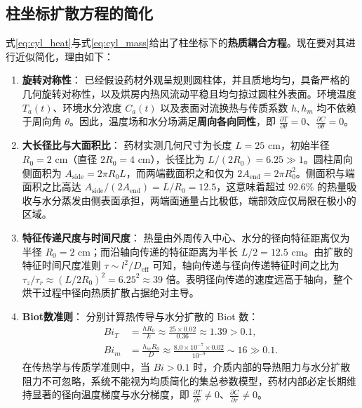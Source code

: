\documentclass[12pt,a4paper,fontset=none]{ctexart}
\begin{document}
\subsection{柱坐标扩散方程的简化}
式\eqref{eq:cyl_heat}与式\eqref{eq:cyl_mass}给出了柱坐标下的\textbf{热质耦合方程}。现在要对其进行近似简化，理由如下：
\begin{enumerate}[label=(\arabic*)]
  \item \textbf{旋转对称性}：
  已经假设药材外观呈规则圆柱体，并且质地均匀，具备严格的几何旋转对称性，以及烘房内热风流动平稳且均匀掠过圆柱外表面。环境温度 $T_a(t)$、环境水分浓度 $C_a(t)$ 以及表面对流换热与传质系数 $h, h_m$ 均不依赖于周向角 $\theta$。因此，温度场和水分场满足\textbf{周向各向同性}，即 $\frac{\partial T}{\partial\theta}=0$、$\frac{\partial C}{\partial\theta}=0$。

  \item \textbf{大长径比与大面积比}：
  药材实测几何尺寸为长度 $L=25\text{ cm}$，初始半径 $R_0=2\text{ cm}$（直径 $2R_0=4\text{ cm}$），长径比为 $L/(2R_0)=6.25\gg1$。圆柱周向侧面积为 $A_{\text{side}}=2\pi R_0 L$，而两端截面积之和仅为 $2A_{\text{end}}=2\pi R_0^2$。侧面积与端面积之比高达 $A_{\text{side}}/(2A_{\text{end}})=L/R_0=12.5$，这意味着超过 $92.6\%$ 的热量吸收与水分蒸发由侧表面承担，两端面通量占比极低，端部效应仅局限在极小的区域。

  \item \textbf{特征传递尺度与时间尺度}：
  热量由外周传入中心、水分的径向特征距离仅为半径 $R_0=2\text{ cm}$；而沿轴向传递的特征距离为半长 $L/2=12.5\text{ cm}$。由扩散的特征时间尺度准则 $\tau \sim l^2/D_{\text{eff}}$ 可知，轴向传递与径向传递特征时间之比为 $\tau_z/\tau_r \approx (L/2R_0)^2 = 6.25^2 \approx 39$ 倍。表明径向传递的速度远高于轴向，整个烘干过程中径向热质扩散占据绝对主导。

  \item \textbf{Biot数准则}：
  分别计算热传导与水分扩散的 Biot 数：
  \begin{align}
  Bi_T &= \frac{h R_0}{k} \approx \frac{25 \times 0.02}{0.36} \approx 1.39 > 0.1,\label{eq:biot_t}\\
  Bi_m &= \frac{h_m R_0}{D} \approx \frac{8.0\times 10^{-7} \times 0.02}{10^{-9}} \sim 16 \gg 0.1.\label{eq:biot_m}
  \end{align}
  在传热学与传质学准则中，当 $Bi > 0.1$ 时，介质内部的导热阻力与水分扩散阻力不可忽略，系统不能视为均质简化的集总参数模型，药材内部必定长期维持显著的径向温度梯度与水分梯度，即 $\frac{\partial T}{\partial r}\neq0$、$\frac{\partial C}{\partial r}\neq0$。
\end{enumerate}
\end{document}
